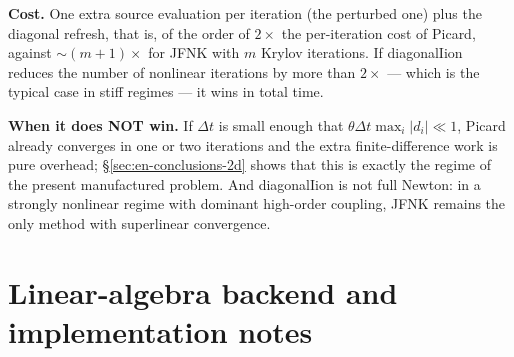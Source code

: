 \documentclass[11pt,a4paper]{article}
\begin{document}
\textbf{Cost.} One extra source evaluation per iteration (the perturbed one) plus the diagonal
refresh, that is, of the order of $2\times$ the per-iteration cost of Picard,
against $\sim(m+1)\times$ for JFNK with $m$ Krylov iterations. If
diagonalIion reduces the number of nonlinear iterations by more than
$2\times$ --- which is the typical case in stiff regimes --- it wins in total
time.

\textbf{When it does NOT win.} If $\Delta t$ is small enough that $\theta\Delta t\max_i|d_i|\ll1$, Picard
already converges in one or two iterations and the extra finite-difference work
is pure overhead; \S\ref{sec:en-conclusions-2d} shows that this is exactly the
regime of the present manufactured problem. And diagonalIion is not full
Newton: in a strongly nonlinear regime with dominant high-order coupling, JFNK
remains the only method with superlinear convergence.

\section{Linear-algebra backend and implementation notes}
\label{sec:linear-backend}
\end{document}
